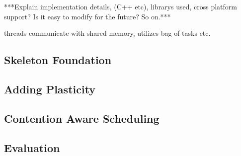 \section{}

***Explain implementation details, (C++ etc), librarys used, cross platform support? Is it easy to modify for the future? So on.***

threads communicate with shared memory, utilizes bag of tasks etc.

\subsection{Skeleton Foundation}
\subsection{Adding Plasticity}
\subsection{Contention Aware Scheduling}
\subsection{Evaluation}